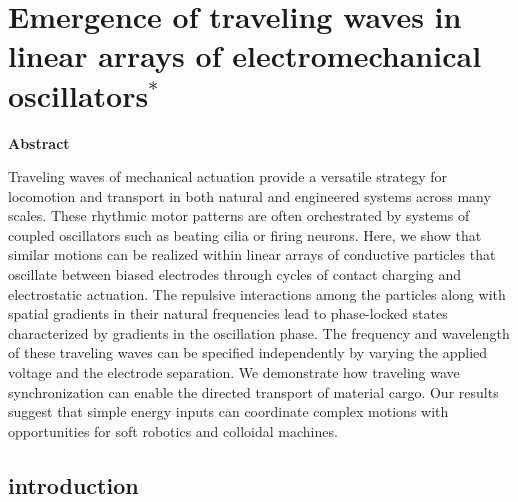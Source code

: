 \chapter{Emergence of traveling waves in linear arrays of electromechanical oscillators$^{*}$}
\begin{center}
\vspace*{1\baselineskip}
\textbf{Abstract}
\end{center}
Traveling waves of mechanical actuation provide a versatile strategy for locomotion and transport in both natural and engineered systems across many scales. These rhythmic motor patterns are often orchestrated by systems of coupled oscillators such as beating cilia or firing neurons. Here, we show that similar motions can be realized within linear arrays of conductive particles that oscillate between biased electrodes through cycles of contact charging and electrostatic actuation. The repulsive interactions among the particles along with spatial gradients in their natural frequencies lead to phase-locked states characterized by gradients in the oscillation phase. The frequency and wavelength of these traveling waves can be specified independently by varying the applied voltage and the electrode separation. We demonstrate how traveling wave synchronization can enable the directed transport of material cargo. Our results suggest that simple energy inputs can coordinate complex motions with opportunities for soft robotics and colloidal machines.

\section{introduction} 

